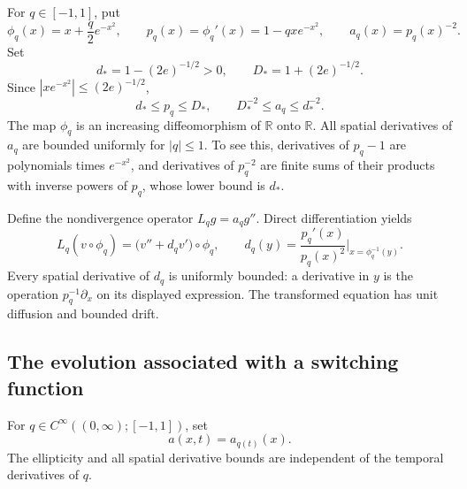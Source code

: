\documentclass[11pt,reqno]{amsart}
\numberwithin{equation}{section}
\theoremstyle{definition}
\theoremstyle{remark}
\newcommand{\R}{\mathbb R}
\begin{document}
For $q\in[-1,1]$, put
\begin{equation}\label{eq:geometryfamily}
 \phi_q(x)=x+\frac q2e^{-x^2},\qquad
 p_q(x)=\phi_q'(x)=1-qxe^{-x^2},\qquad
 a_q(x)=p_q(x)^{-2}.
\end{equation}
Set
\[
 d_*=1-(2e)^{-1/2}>0,\qquad D_*=1+(2e)^{-1/2}.
\]
Since $|xe^{-x^2}|\leq(2e)^{-1/2}$,
\begin{equation}\label{eq:uniformfamily}
 d_*\leq p_q\leq D_*,\qquad D_*^{-2}\leq a_q\leq d_*^{-2}.
\end{equation}
The map $\phi_q$ is an increasing diffeomorphism of $\R$ onto $\R$. All spatial derivatives of $a_q$ are bounded uniformly for $|q|\leq1$. To see this, derivatives of $p_q-1$ are polynomials times $e^{-x^2}$, and derivatives of $p_q^{-2}$ are finite sums of their products with inverse powers of $p_q$, whose lower bound is $d_*$.

Define the nondivergence operator $L_qg=a_qg''$. Direct differentiation yields
\begin{equation}\label{eq:frozenconjugacy}
 L_q(v\circ\phi_q)
 =\bigl(v''+d_qv'\bigr)\circ\phi_q,
 \qquad
 d_q(y)=\frac{p_q'(x)}{p_q(x)^2}\bigg|_{x=\phi_q^{-1}(y)}.
\end{equation}
Every spatial derivative of $d_q$ is uniformly bounded: a derivative in $y$ is the operation $p_q^{-1}\partial_x$ on its displayed expression. The transformed equation has unit diffusion and bounded drift.

\subsection{The evolution associated with a switching function}
For $q\in C^\infty((0,\infty);[-1,1])$, set
\begin{equation}\label{eq:timefamily}
 a(x,t)=a_{q(t)}(x).
\end{equation}
The ellipticity and all spatial derivative bounds are independent of the temporal derivatives of $q$.
\end{document}
